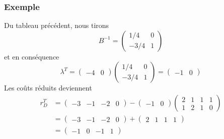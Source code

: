 \documentclass[usepdftitle=false]{beamer}
\begin{document}
\begin{frame}
\frametitle{Exemple}

Du tableau précédent, nous tirons
\[
B^{-1} =
\begin{pmatrix}
1/4 & 0 \\
-3/4 & 1
\end{pmatrix}
\]
et en conséquence
\[
\lambda^T = \begin{pmatrix} -4 & 0 \end{pmatrix}
\begin{pmatrix}
1/4 & 0 \\
-3/4 & 1
\end{pmatrix} =  
\begin{pmatrix} -1 & 0 \end{pmatrix}
\]
Les coûts réduits deviennent
\begin{align*}
r_D^T &=
\begin{pmatrix}
-3 & -1 & -2 & 0
\end{pmatrix}
-
\begin{pmatrix}
-1 & 0
\end{pmatrix}
\begin{pmatrix}
2 & 1 & 1 & 1 \\
1 & 2 & 1 & 0
\end{pmatrix} \\
&=
\begin{pmatrix}
-3 & -1 & -2 & 0
\end{pmatrix} +
\begin{pmatrix}
2 & 1 & 1 & 1
\end{pmatrix} \\
&=
\begin{pmatrix}
-1 & 0 & -1 & 1
\end{pmatrix}
\end{align*}

\end{frame}
\end{document}
